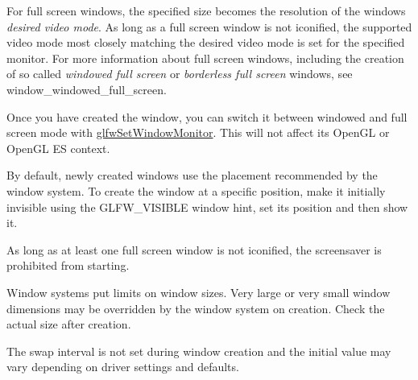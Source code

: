 For full screen windows, the specified size becomes the resolution of the window\textquotesingle{}s {\itshape desired video mode}. As long as a full screen window is not iconified, the supported video mode most closely matching the desired video mode is set for the specified monitor. For more information about full screen windows, including the creation of so called {\itshape windowed full screen} or {\itshape borderless full screen} windows, see window\+\_\+windowed\+\_\+full\+\_\+screen.

Once you have created the window, you can switch it between windowed and full screen mode with \mbox{\hyperlink{group__window_ga12fabf78575e59c00f822f323ae0b6ae}{glfw\+Set\+Window\+Monitor}}. This will not affect its Open\+GL or Open\+GL ES context.

By default, newly created windows use the placement recommended by the window system. To create the window at a specific position, make it initially invisible using the G\+L\+F\+W\+\_\+\+V\+I\+S\+I\+B\+LE window hint, set its position and then show it.

As long as at least one full screen window is not iconified, the screensaver is prohibited from starting.

Window systems put limits on window sizes. Very large or very small window dimensions may be overridden by the window system on creation. Check the actual size after creation.

The swap interval is not set during window creation and the initial value may vary depending on driver settings and defaults.


